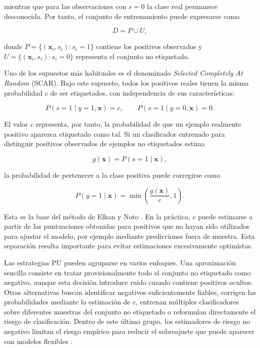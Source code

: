     mientras que para las observaciones con \(s=0\) la clase real permanece desconocida. Por tanto, el conjunto de entrenamiento puede expresarse como

    \[
    D = P \cup U,
    \]

    donde \(P=\{(\mathbf{x}_i,s_i):s_i=1\}\) contiene los positivos observados y \(U=\{(\mathbf{x}_i,s_i):s_i=0\}\) representa el conjunto no etiquetado.

    Uno de los supuestos más habituales es el denominado \textit{Selected Completely At Random} (SCAR). Bajo este supuesto, todos los positivos reales tienen la misma probabilidad \(c\) de ser etiquetados, con independencia de sus características:

    \[
    P(s=1\mid y=1,\mathbf{x})=c,
    \qquad
    P(s=1\mid y=0,\mathbf{x})=0.
    \]

    El valor \(c\) representa, por tanto, la probabilidad de que un ejemplo realmente positivo aparezca etiquetado como tal. Si un clasificador entrenado para distinguir positivos observados de ejemplos no etiquetados estima

    \[
    g(\mathbf{x})=P(s=1\mid\mathbf{x}),
    \]

    la probabilidad de pertenecer a la clase positiva puede corregirse como

    \[
    P(y=1\mid\mathbf{x})
    =
    \min\left(\frac{g(\mathbf{x})}{c},1\right).
    \]

    Esta es la base del método de Elkan y Noto \cite{Elkan2008}. En la práctica, \(c\) puede estimarse a partir de las puntuaciones obtenidas para positivos que no hayan sido utilizados para ajustar el modelo, por ejemplo mediante predicciones fuera de muestra. Esta separación resulta importante para evitar estimaciones excesivamente optimistas.

    Las estrategias PU pueden agruparse en varios enfoques. Una aproximación sencilla consiste en tratar provisionalmente todo el conjunto no etiquetado como negativo, aunque esta decisión introduce ruido cuando contiene positivos ocultos. Otras alternativas buscan identificar negativos suficientemente fiables, corrigen las probabilidades mediante la estimación de \(c\), entrenan múltiples clasificadores sobre diferentes muestras del conjunto no etiquetado o reformulan directamente el riesgo de clasificación. Dentro de este último grupo, los estimadores de riesgo no negativo limitan el riesgo empírico para reducir el sobreajuste que puede aparecer con modelos flexibles \cite{Kiryo2017}.

